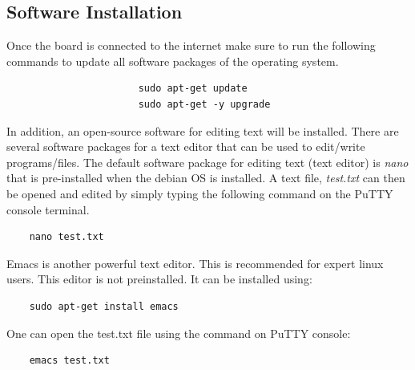 
%

%
%


\subsection{Software Installation}
\label{sec:softwareInstallation}
Once the board is connected to the internet make sure to run the following commands to update all software packages of the operating system. %
%
\begin{verbatim}
                       sudo apt-get update
                       sudo apt-get -y upgrade
\end{verbatim}
%
In addition, an open-source software for editing text will be installed. There are several software packages for a text editor that can be used to edit/write programs/files. The default software package for editing text (text editor) is \emph{nano} that is pre-installed when the debian OS is installed. A text file, \emph{test.txt} can then be opened and edited by simply typing the following command on the PuTTY console terminal. %
%
\begin{verbatim}
    nano test.txt 
\end{verbatim}
%
Emacs is another powerful text editor. This is recommended for expert linux users. This editor is not preinstalled. It can be installed using:
\begin{verbatim}
    sudo apt-get install emacs 
\end{verbatim}
%
One can open the test.txt file using the command on PuTTY console: 
\begin{verbatim}
    emacs test.txt
\end{verbatim}



